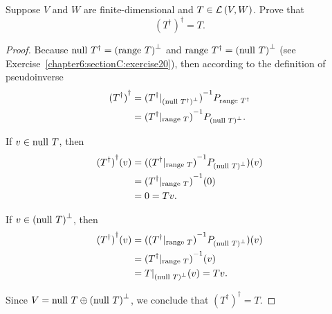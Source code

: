 \begin{exercise}\label{chapter6:sectionC:exercise23}
    Suppose $V$ and $W$ are finite-dimensional and $T\in\mathcal{L}\left({V, W}\right)$. Prove that
    \[
        {(T^{\dagger})}^{\dagger} = T.
    \]
\end{exercise}

\begin{proof}
    Because $\operatorname{null}\,{T^{\dagger}} = {(\operatorname{range}\,{T})}^{\bot}$ and $\operatorname{range}\,{T^{\dagger}} = {(\operatorname{null}\,{T})}^{\bot}$ (see Exercise~\ref{chapter6:sectionC:exercise20}), then according to the definition of pseudoinverse
    \begin{align*}
        {(T^{\dagger})}^{\dagger} & = {(T^{\dagger}\vert_{{(\operatorname{null}\,{T^{\dagger}})}^{\bot}})}^{-1}P_{\operatorname{range}\,{T^{\dagger}}} \\
                                  & = {(T^{\dagger}\vert_{\operatorname{range}\,{T}})}^{-1}P_{{(\operatorname{null}\,{T})}^{\bot}}.
    \end{align*}

    If $v\in \operatorname{null}\,{T}$, then
    \begin{align*}
        {(T^{\dagger})}^{\dagger}(v) & = ({(T^{\dagger}\vert_{\operatorname{range}\,{T}})}^{-1}P_{{(\operatorname{null}\,{T})}^{\bot}})(v) \\
                                     & = {(T^{\dagger}\vert_{\operatorname{range}\,{T}})}^{-1}(0)                            \\
                                     & = 0 = Tv.
    \end{align*}

    If $v\in {(\operatorname{null}\,{T})}^{\bot}$, then
    \begin{align*}
        {(T^{\dagger})}^{\dagger}(v) & = ({(T^{\dagger}\vert_{\operatorname{range}\,{T}})}^{-1}P_{{(\operatorname{null}\,{T})}^{\bot}})(v) \\
                                     & = {(T^{\dagger}\vert_{\operatorname{range}\,{T}})}^{-1}(v)                            \\
                                     & = T\vert_{{(\operatorname{null}\,{T})}^{\bot}}(v) = Tv.
    \end{align*}

    Since $V = \operatorname{null}\,{T}\oplus {(\operatorname{null}\,{T})}^{\bot}$, we conclude that ${(T^{\dagger})}^{\dagger} = T$.
\end{proof}
\newpage
